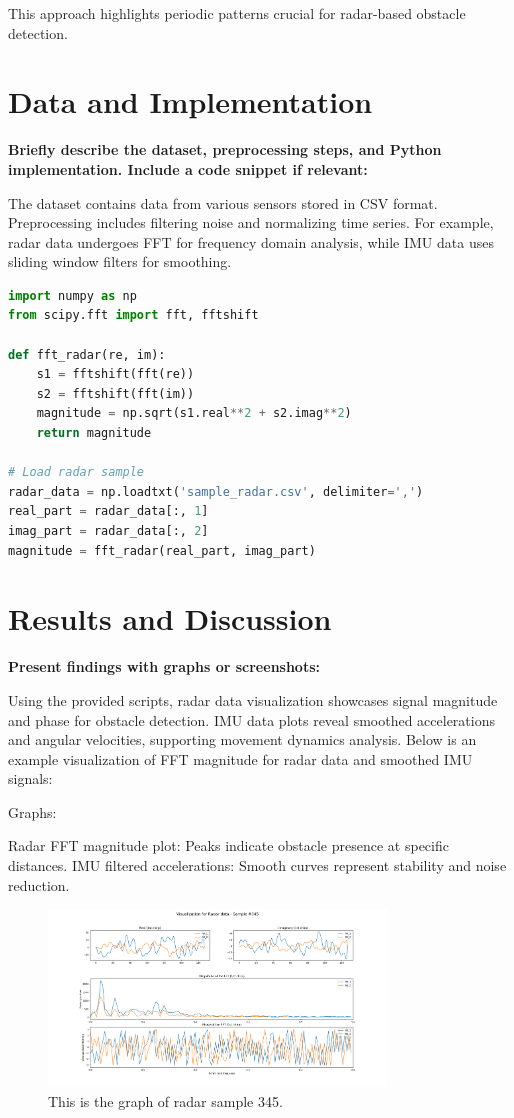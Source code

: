 \documentclass[12pt,a4paper]{article}
\begin{document}
This approach highlights periodic patterns crucial for radar-based obstacle detection.
\section{Data and Implementation}
\textbf{Briefly describe the dataset, preprocessing steps, and Python implementation. Include a code snippet if relevant:}

The dataset contains data from various sensors stored in CSV format. Preprocessing includes filtering noise and normalizing time series. For example, radar data undergoes FFT for frequency domain analysis, while IMU data uses sliding window filters for smoothing.

\begin{lstlisting}[language=Python, caption=Radar Data undergoes FFT]
import numpy as np
from scipy.fft import fft, fftshift

def fft_radar(re, im):
    s1 = fftshift(fft(re))
    s2 = fftshift(fft(im))
    magnitude = np.sqrt(s1.real**2 + s2.imag**2)
    return magnitude

# Load radar sample
radar_data = np.loadtxt('sample_radar.csv', delimiter=',')
real_part = radar_data[:, 1]
imag_part = radar_data[:, 2]
magnitude = fft_radar(real_part, imag_part)

\end{lstlisting}
\section{Results and Discussion}
\textbf{Present findings with graphs or screenshots:}

Using the provided scripts, radar data visualization showcases signal magnitude and phase for obstacle detection. IMU data plots reveal smoothed accelerations and angular velocities, supporting movement dynamics analysis. Below is an example visualization of FFT magnitude for radar data and smoothed IMU signals:

Graphs:

Radar FFT magnitude plot: Peaks indicate obstacle presence at specific distances.
IMU filtered accelerations: Smooth curves represent stability and noise reduction.
\begin{figure}[h!]
    \centering
    \includegraphics[width=0.8\textwidth]{radar_sample_345.png} 
    \caption{This is the graph of radar sample 345.}
    \label{fig:Radar_sample_345}
\end{figure}
\end{document}
